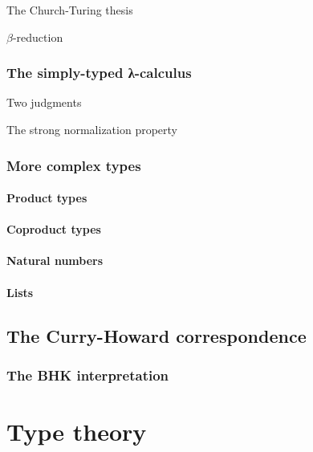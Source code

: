 \documentclass[12pt,twoside,draft]{reedthesis}
\begin{document}
The Church-Turing thesis

$β$-reduction

\subsection{The simply-typed λ-calculus}
\label{subsec:the-simply-typed-lambda-calculus}

Two judgments

The strong normalization property

\subsection{More complex types}
\label{subsec:more-complex-types}

\subsubsection{Product types}
\label{subsubsec:product-types}

\subsubsection{Coproduct types}
\label{subsubsec:coproduct-types}

\subsubsection{Natural numbers}
\label{subsubsec:natural-numbers}

\subsubsection{Lists}
\label{subsubsec:lists}

\section{The Curry-Howard correspondence}
\label{sec:curry-howard}

\cite{curry-howard}

\subsection{The BHK interpretation}
\label{subsec:the-bhk-interpretation}

\chapter{Type theory}
\label{chap:type-theory}
\end{document}
